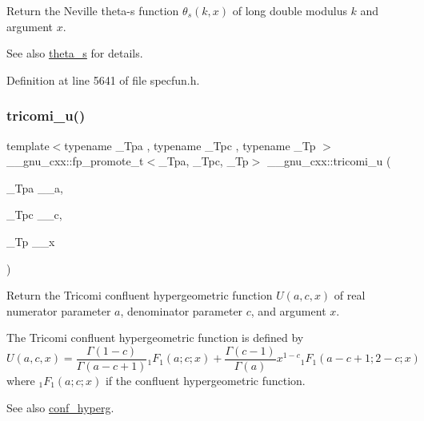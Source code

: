 Return the Neville theta-\/s function $ \theta_s(k,x) $ of {\ttfamily long double} modulus $ k $ and argument $ x $.

\begin{DoxySeeAlso}{See also}
\hyperlink{group__gnu__math__spec__func_gaf28f2dca107531890b49cccf2bdd67be}{theta\+\_\+s} for details. 
\end{DoxySeeAlso}


Definition at line 5641 of file specfun.\+h.

\mbox{\label{group__gnu__math__spec__func_gaf51a13fad85006e4d65c5b117e49f7d8}} 
\subsubsection{\texorpdfstring{tricomi\+\_\+u()}{tricomi\_u()}}
{\footnotesize\ttfamily template$<$typename \+\_\+\+Tpa , typename \+\_\+\+Tpc , typename \+\_\+\+Tp $>$ \\
\+\_\+\+\_\+gnu\+\_\+cxx\+::fp\+\_\+promote\+\_\+t$<$\+\_\+\+Tpa, \+\_\+\+Tpc, \+\_\+\+Tp$>$ \+\_\+\+\_\+gnu\+\_\+cxx\+::tricomi\+\_\+u (\begin{DoxyParamCaption}\item[{\+\_\+\+Tpa}]{\+\_\+\+\_\+a,  }\item[{\+\_\+\+Tpc}]{\+\_\+\+\_\+c,  }\item[{\+\_\+\+Tp}]{\+\_\+\+\_\+x }\end{DoxyParamCaption})\hspace{0.3cm}{\ttfamily [inline]}}

Return the Tricomi confluent hypergeometric function $ U(a,c,x) $ of real numerator parameter $ a $, denominator parameter $ c $, and argument $ x $.

The Tricomi confluent hypergeometric function is defined by \[ U(a,c,x) = \frac{\Gamma(1-c)}{\Gamma(a-c+1)} {}_1F_1(a;c;x) + \frac{\Gamma(c-1)}{\Gamma(a)} x^{1-c} {}_1F_1(a-c+1;2-c;x) \] where $ {}_1F_1(a;c;x) $ if the confluent hypergeometric function.

\begin{DoxySeeAlso}{See also}
\hyperlink{group__gnu__math__spec__func_ga4d01e85e7d295afca5d9f8b6c68f19cc}{conf\+\_\+hyperg}.
\end{DoxySeeAlso}

